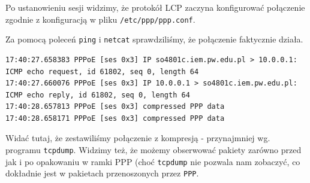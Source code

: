 Po ustanowieniu sesji widzimy, że protokół LCP zaczyna konfigurować połączenie \tcp{} zgodnie z konfiguracją w pliku \texttt{/etc/ppp/ppp.conf}.

Za pomocą poleceń \texttt{ping} i \texttt{netcat} sprawdziliśmy, że połączenie faktycznie działa.
\begin{lstlisting}
17:40:27.658383 PPPoE [ses 0x3] IP so4801c.iem.pw.edu.pl > 10.0.0.1: ICMP echo request, id 61802, seq 0, length 64
17:40:27.660076 PPPoE [ses 0x3] IP 10.0.0.1 > so4801c.iem.pw.edu.pl: ICMP echo reply, id 61802, seq 0, length 64
17:40:28.657813 PPPoE [ses 0x3] compressed PPP data
17:40:28.658171 PPPoE [ses 0x3] compressed PPP data
\end{lstlisting}
Widać tutaj, że zestawiliśmy połączenie z kompresją - przynajmniej wg. programu \texttt{tcpdump}.
Widzimy też, że możemy obserwować pakiety zarówno przed jak i po opakowaniu w ramki PPP (choć \texttt{tcpdump} nie pozwala nam zobaczyć, co dokładnie jest w pakietach przenoszonych przez \texttt{PPP}.
